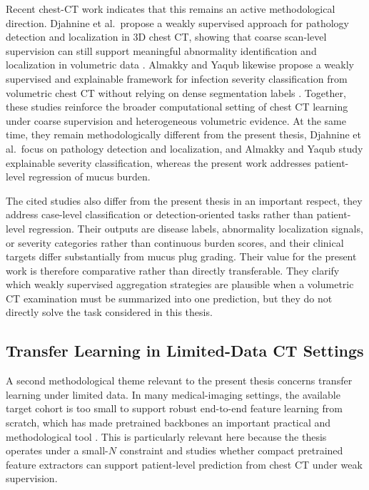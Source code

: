 Recent chest-CT work indicates that this remains an active methodological direction. Djahnine et al.\ propose a weakly supervised approach for pathology detection and localization in 3D chest CT, showing that coarse scan-level supervision can still support meaningful abnormality identification and localization in volumetric data \cite{djahnine2024weakly}. Almakky and Yaqub likewise propose a weakly supervised and explainable framework for infection severity classification from volumetric chest CT without relying on dense segmentation labels \cite{almakky2025weakly}. Together, these studies reinforce the broader computational setting of chest CT learning under coarse supervision and heterogeneous volumetric evidence. At the same time, they remain methodologically different from the present thesis, Djahnine et al.\ focus on pathology detection and localization, and Almakky and Yaqub study explainable severity classification, whereas the present work addresses patient-level regression of mucus burden.

The cited studies also differ from the present thesis in an important respect, they address case-level classification or detection-oriented tasks rather than patient-level regression. Their outputs are disease labels, abnormality localization signals, or severity categories rather than continuous burden scores, and their clinical targets differ substantially from mucus plug grading. Their value for the present work is therefore comparative rather than directly transferable. They clarify which weakly supervised aggregation strategies are plausible when a volumetric CT examination must be summarized into one prediction, but they do not directly solve the task considered in this thesis.


\subsection{Transfer Learning in Limited-Data CT Settings}
A second methodological theme relevant to the present thesis concerns transfer learning under limited data. In many medical-imaging settings, the available target cohort is too small to support robust end-to-end feature learning from scratch, which has made pretrained backbones an important practical and methodological tool \cite{kim2022transfer}. This is particularly relevant here because the thesis operates under a small-$N$ constraint and studies whether compact pretrained feature extractors can support patient-level prediction from chest CT under weak supervision.

